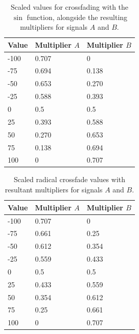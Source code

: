 \documentclass[12pt,twoside]{report}
\begin{document}
\begin{table}[h!]

  \centering

  \begin{tabular}[]{| l | l | l |}
    \hline
    \rowcolor[gray]{0.8}
    Value & Multiplier $A$ & Multiplier $B$ \\\hline
    -100 & 0.707 & 0\\\hline
    -75 & 0.694 & 0.138\\\hline
    -50 & 0.653 & 0.270\\\hline
    -25 & 0.588 & 0.393\\\hline
    0 & 0.5 & 0.5\\\hline
    25 & 0.393 & 0.588\\\hline
    50 & 0.270 & 0.653\\\hline
    75 & 0.138 & 0.694\\\hline
    100 & 0 & 0.707\\
    \hline
  \end{tabular}

  \caption{Scaled values for crossfading with the $\sin$ function, alongside the resulting multipliers for signals $A$ and $B$.}

  \label{tb:scrossfadesc}

\end{table}

\begin{table}[ht!]

  \centering

  \begin{tabular}[]{| l | l | l |}
    \hline
    \rowcolor[gray]{0.8}
    Value & Multiplier $A$ & Multiplier $B$ \\\hline
    -100 & 0.707 & 0\\\hline
    -75 & 0.661 & 0.25\\\hline
    -50 & 0.612 & 0.354\\\hline
    -25 & 0.559 & 0.433\\\hline
    0 & 0.5 & 0.5\\\hline
    25 & 0.433 & 0.559\\\hline
    50 & 0.354 & 0.612\\\hline
    75 & 0.25 & 0.661\\\hline
    100 & 0 & 0.707\\
    \hline
  \end{tabular}

  \caption{Scaled radical crossfade values with resultant multipliers for signals $A$ and $B$.}

  \label{tb:sqrtcrossfade}

\end{table}
\end{document}
